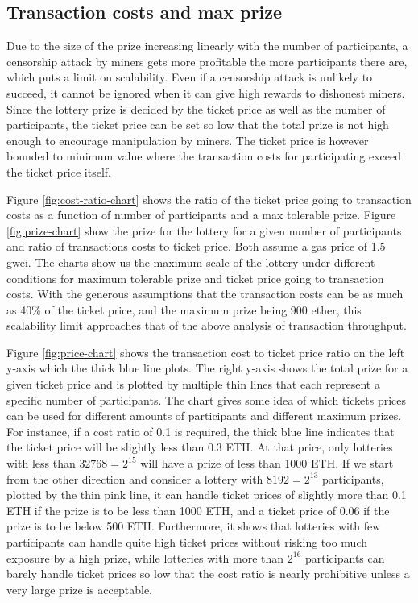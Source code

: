 \subsection{Transaction costs and max prize}

Due to the size of the prize increasing linearly with the number of participants, a censorship attack by miners gets more profitable the more participants there are, which puts a limit on scalability. Even if a censorship attack is unlikely to succeed, it cannot be ignored when it can give high rewards to dishonest miners. Since the lottery prize is decided by the ticket price as well as the number of participants, the ticket price can be set so low that the total prize is not high enough to encourage manipulation by miners. The ticket price is however bounded to minimum value where the transaction costs for participating exceed the ticket price itself.

Figure \ref{fig:cost-ratio-chart} shows the ratio of the ticket price going to transaction costs as a function of number of participants and a max tolerable prize. Figure \ref{fig:prize-chart} show the prize for the lottery for a given number of participants and ratio of transactions costs to ticket price. Both assume a gas price of 1.5 gwei.
The charts show us the maximum scale of the lottery under different conditions for maximum tolerable prize and ticket price going to transaction costs. With the generous assumptions that the transaction costs can be as much as 40\% of the ticket price, and the maximum prize being 900 ether, this scalability limit approaches that of the above analysis of transaction throughput.

Figure \ref{fig:price-chart} shows the transaction cost to ticket price ratio on the left y-axis which the thick blue line plots. The right y-axis shows the total prize for a given ticket price and is plotted by multiple thin lines that each represent a specific number of participants. The chart gives some idea of which tickets prices can be used for different amounts of participants and different maximum prizes. For instance, if a cost ratio of 0.1 is required, the thick blue line indicates that the ticket price will be slightly less than 0.3 ETH. At that price, only lotteries with less than $32768=2^{15}$ will have a prize of less than 1000 ETH. If we start from the other direction and consider a lottery with $8192=2^{13}$ participants, plotted by the thin pink line, it can handle ticket prices of slightly more than 0.1 ETH if the prize is to be less than 1000 ETH, and a ticket price of 0.06 if the prize is to be below 500 ETH. Furthermore, it shows that lotteries with few participants can handle quite high ticket prices without risking too much exposure by a high prize, while lotteries with more than $2^{16}$ participants can barely handle ticket prices so low that the cost ratio is nearly prohibitive unless a very large prize is acceptable.


